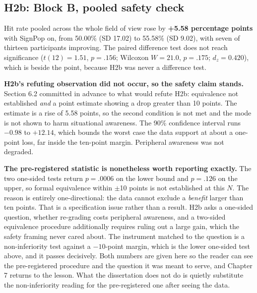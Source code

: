 \subsection{H2b: Block B, pooled safety check}

Hit rate pooled across the whole field of view rose by \textbf{+5.58 percentage points} with SignPop
on, from 50.00\% (SD 17.02) to 55.58\% (SD 9.02), with seven of thirteen participants improving. The
paired difference test does not reach significance ($t(12) = 1.51$, $p = .156$; Wilcoxon $W = 21.0$,
$p = .175$; $d_z = 0.420$), which is beside the point, because H2b was never a difference test.

\textbf{H2b's refuting observation did not occur, so the safety claim stands.} Section 6.2 committed
in advance to what would refute H2b: equivalence not established \textit{and} a point estimate showing
a drop greater than 10 points. The estimate is a rise of 5.58 points, so the second condition is not
met and the mode is not shown to harm situational awareness. The 90\% confidence interval runs
$-0.98$ to $+12.14$, which bounds the worst case the data support at about a one-point loss, far
inside the ten-point margin. Peripheral awareness was not degraded.

\textbf{The pre-registered statistic is nonetheless worth reporting exactly.} The two one-sided tests
return $p = .0006$ on the lower bound and $p = .126$ on the upper, so formal equivalence within
$\pm$10 points is not established at this $N$. The reason is entirely one-directional: the data
cannot exclude a \textit{benefit} larger than ten points. That is a specification issue rather than a
result. H2b asks a one-sided question, whether re-grading costs peripheral awareness, and a two-sided
equivalence procedure additionally requires ruling out a large gain, which the safety framing never
cared about. The instrument matched to the question is a non-inferiority test against a $-10$-point
margin, which is the lower one-sided test above, and it passes decisively. Both numbers are given
here so the reader can see the pre-registered procedure and the question it was meant to serve, and
Chapter 7 returns to the lesson. What the dissertation does not do is quietly substitute the
non-inferiority reading for the pre-registered one after seeing the data.


